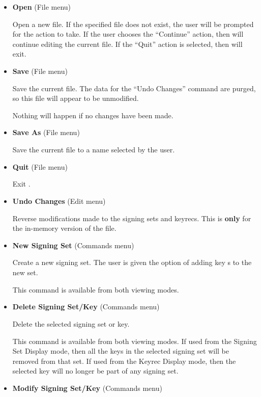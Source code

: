 \begin{itemize}

\item {\bf Open} (File menu)\verb" "

Open a new  file.  If the specified file does not exist, the
user will be prompted for the action to take.  If the user chooses the
``Continue'' action, then  will continue editing the current
 file.  If the ``Quit'' action is selected, then
 will exit.

\item {\bf Save} (File menu)\verb" "

Save the current  file.  The data for the ``Undo Changes''
command are purged, so this file will appear to be unmodified.

Nothing will happen if no changes have been made.

\item {\bf Save As} (File menu)\verb" "

Save the current  file to a name selected by the user.

\item {\bf Quit} (File menu)\verb" "

Exit .

\item {\bf Undo Changes} (Edit menu)\verb" "

Reverse modifications made to the signing sets and keyrecs.  This is {\bf only}
for the in-memory version of the  file.

\item {\bf New Signing Set} (Commands menu)\verb" "

Create a new signing set.   The user is given the option of adding key
s to the new set.

This command is available from both viewing modes.

\item {\bf Delete Signing Set/Key} (Commands menu)\verb" "

Delete the selected signing set or key.

This command is available from both viewing modes.  If used from the Signing
Set Display mode, then all the keys in the selected signing set will be
removed from that set.  If used from the Keyrec Display mode, then the
selected key will no longer be part of any signing set.

\item {\bf Modify Signing Set/Key} (Commands menu)\verb" "


\end{itemize}
